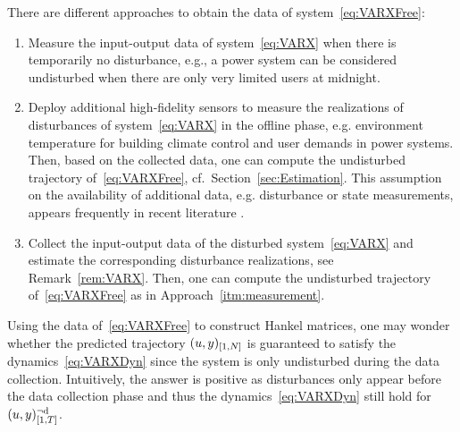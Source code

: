 \begin{rem}
	There are different approaches to obtain the data of system~\eqref{eq:VARXFree}: 
		\begin{enumerate}[label=(\roman*)]
			\item Measure the input-output data of system~\eqref{eq:VARX} when there is temporarily no disturbance, e.g., a power system can be considered undisturbed when there are only very limited users at midnight.
			\item\label{itm:measurement} Deploy additional high-fidelity sensors to measure the realizations of disturbances of system~\eqref{eq:VARX} in the offline phase, e.g. environment temperature for building climate control and user demands in power systems. Then, based on the collected data, one can compute the undisturbed trajectory of~\eqref{eq:VARXFree}, cf.~Section~\ref{sec:Estimation}. This assumption on the availability of additional data, e.g. disturbance or state measurements, appears frequently in recent literature \citep{wolff24robust,disaro24equivalence}.
			\item Collect the input-output data of the disturbed system~\eqref{eq:VARX} and estimate the corresponding disturbance realizations, see Remark~\ref{rem:VARX}. Then, one can compute the undisturbed trajectory of~\eqref{eq:VARXFree} as in Approach~\ref{itm:measurement}.
		\end{enumerate}
\end{rem}
Using the data of~\eqref{eq:VARXFree} to construct Hankel matrices, one may wonder whether the predicted trajectory $(u,y)_{[1,N]}$ is guaranteed to satisfy the  dynamics~\eqref{eq:VARXDyn} since the system is only undisturbed during the data collection. Intuitively, the answer is positive as disturbances only appear before the data collection phase and thus the dynamics~\eqref{eq:VARXDyn} still hold for $(u,y)_{[1,T]}^{\neg\mathrm{d}}$.

